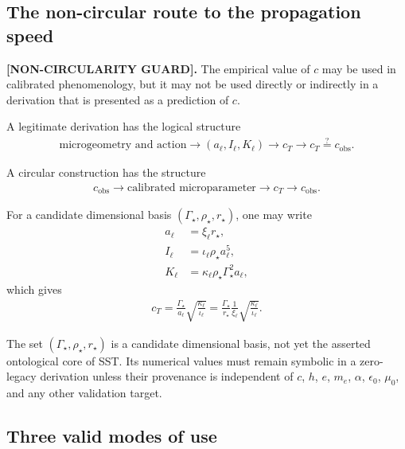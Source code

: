 \documentclass[11pt]{article}
\theoremstyle{definition}
\theoremstyle{plain}
\theoremstyle{remark}
\begin{document}
\subsection{The non-circular route to the propagation speed}
\label{subsec:noncircular_route_to_c}

\textbf{[NON-CIRCULARITY GUARD].}
The empirical value of $c$ may be used in calibrated phenomenology, but it may
not be used directly or indirectly in a derivation that is presented as a
prediction of $c$.

A legitimate derivation has the logical structure
\begin{align}
    \text{microgeometry and action}
    \longrightarrow
    (a_\ell,I_\ell,K_\ell)
    \longrightarrow
    c_T
    \longrightarrow
    c_T\stackrel{?}{=}c_{\mathrm{obs}}.
    \label{eq:noncircular_c_chain}
\end{align}

A circular construction has the structure
\begin{align}
    c_{\mathrm{obs}}
    \longrightarrow
    \text{calibrated microparameter}
    \longrightarrow
    c_T
    \longrightarrow
    c_{\mathrm{obs}}.
    \label{eq:circular_c_chain}
\end{align}

For a candidate dimensional basis $(\Gamma_\star,\rho_\star,r_\star)$, one may
write
\begin{align}
    a_\ell
    &=
    \xi_\ell r_\star,
    \\
    I_\ell
    &=
    \iota_\ell\rho_\star a_\ell^5,
    \\
    K_\ell
    &=
    \kappa_\ell\rho_\star\Gamma_\star^2a_\ell,
    \label{eq:zero_legacy_link_scaling}
\end{align}
which gives
\begin{align}
    c_T
    =
    \frac{\Gamma_\star}{a_\ell}
    \sqrt{\frac{\kappa_\ell}{\iota_\ell}}
    =
    \frac{\Gamma_\star}{r_\star}
    \frac{1}{\xi_\ell}
    \sqrt{\frac{\kappa_\ell}{\iota_\ell}}.
    \label{eq:zero_legacy_c_candidate}
\end{align}

The set $(\Gamma_\star,\rho_\star,r_\star)$ is a candidate dimensional basis,
not yet the asserted ontological core of SST. Its numerical values must remain
symbolic in a zero-legacy derivation unless their provenance is independent of
$c$, $h$, $e$, $m_e$, $\alpha$, $\epsilon_0$, $\mu_0$, and any other validation
target.

\subsection{Three valid modes of use}
\label{subsec:three_valid_modes_of_use}
\end{document}
